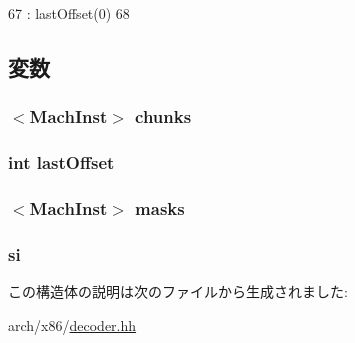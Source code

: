 \begin{DoxyCode}
67                     : lastOffset(0)
68         {}
\end{DoxyCode}


\subsection{変数}
\hypertarget{structX86ISA_1_1Decoder_1_1InstBytes_af7aeb5f9436fa23d13dae1008bace5bd}{
\subsubsection[{chunks}]{$<${\bf MachInst}$>$ {\bf chunks}}}
\label{structX86ISA_1_1Decoder_1_1InstBytes_af7aeb5f9436fa23d13dae1008bace5bd}
\hypertarget{structX86ISA_1_1Decoder_1_1InstBytes_a50e2e39cbf969a7838e50a0dc8ddf88d}{
\subsubsection[{lastOffset}]{\setlength{\rightskip}{0pt plus 5cm}int {\bf lastOffset}}}
\label{structX86ISA_1_1Decoder_1_1InstBytes_a50e2e39cbf969a7838e50a0dc8ddf88d}
\hypertarget{structX86ISA_1_1Decoder_1_1InstBytes_ab2cdbb4c6963b40aa0924277bea8f8bf}{
\subsubsection[{masks}]{$<${\bf MachInst}$>$ {\bf masks}}}
\label{structX86ISA_1_1Decoder_1_1InstBytes_ab2cdbb4c6963b40aa0924277bea8f8bf}
\hypertarget{structX86ISA_1_1Decoder_1_1InstBytes_ab06cd255e6bbc9122ae8010deb227fcb}{
\subsubsection[{si}]{ {\bf si}}}
\label{structX86ISA_1_1Decoder_1_1InstBytes_ab06cd255e6bbc9122ae8010deb227fcb}


この構造体の説明は次のファイルから生成されました:\begin{DoxyCompactItemize}
\item 
arch/x86/\hyperlink{x86_2decoder_8hh}{decoder.hh}\end{DoxyCompactItemize}
